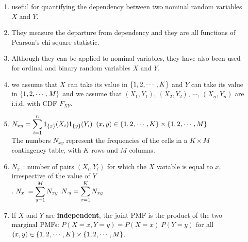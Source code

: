 \begin{enumerate}
    \item useful for quantifying the dependency between two nominal random variables $X$ and $Y$.
    \hfill \cite{statistics/book/Statistics-for-Data-Scientists/Maurits-Kaptein}

    \item They measure the departure from dependency and they are all functions of Pearson’s chi-square statistic.
    \hfill \cite{statistics/book/Statistics-for-Data-Scientists/Maurits-Kaptein}

    \item Although they can be applied to nominal variables, they have also been used for ordinal and binary random variables $X$ and $Y $. 
    \hfill \cite{statistics/book/Statistics-for-Data-Scientists/Maurits-Kaptein}

    \item we assume that $X$ can take its value in $\left\{1, 2, \cdots  , K \right\}$ and $Y$ can take its value in $\left\{1, 2, \cdots  , M\right\}$ and we assume that $(X_1, Y_1)$, $(X_2, Y_2)$, $\cdots  $, $(X_n , Y_n )$ are i.i.d. with CDF $F_{X Y} $.
    \hfill \cite{statistics/book/Statistics-for-Data-Scientists/Maurits-Kaptein}

    \item 
    $N_{x y} = \displaystyle\sum^n_{i=1} 1_{\left\{x\right\}}(X_i )1_{\left\{y\right\}}(Y_i )$
    \hfill
    $(x, y) \in \left\{1, 2, \cdots , K \right\} \times \left\{1, 2, \cdots , M\right\}$
    \hfill \cite{statistics/book/Statistics-for-Data-Scientists/Maurits-Kaptein}
    \\[0.3cm]
    The numbers $N_{x y}$ represent the frequencies of the cells in a $K × M$ contingency table, with $K$ rows and $M$ columns. 
    \hfill \cite{statistics/book/Statistics-for-Data-Scientists/Maurits-Kaptein}

    \item $N_{x\cdot}$: number of pairs $(X_i , Y_i )$ for which the $X$ variable is equal to $x$, irrespective of the value of $Y$
    \hfill \cite{statistics/book/Statistics-for-Data-Scientists/Maurits-Kaptein}
    \\[0.3cm]
    .\hfill
    $N_{x\cdot} = \displaystyle\sum^M _{y=1} N_{x y}$
    \hfill
    $N_{\cdot y} = \displaystyle\sum^K _{x=1} N_{x y}$
    \hfill \cite{statistics/book/Statistics-for-Data-Scientists/Maurits-Kaptein}

    \item If $X$ and $Y$ are \textbf{independent}, the joint PMF is the product of the two marginal PMFs: $P(X = x, Y = y) = P(X = x)\ P(Y = y)$ for all $(x, y) \in \left\{1, 2, \cdots , K \right\} \times \left\{1, 2, \cdots , M\right\}$.
    \hfill \cite{statistics/book/Statistics-for-Data-Scientists/Maurits-Kaptein}


\end{enumerate}
